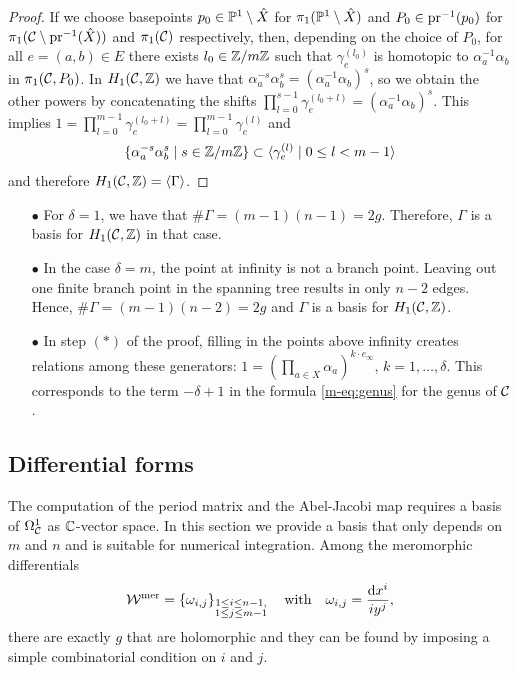 \documentclass[main.tex]{subfiles}
\begin{document}
\begin{proof}
  If we choose basepoints $p_0 \in \P^1 \setminus \hat{X}$ for $\pi_1(\P^1 \setminus \hat{X})$ and $P_0 \in \pr^{-1}(p_0)$ for $\pi_1(\cu \setminus \pr^{-1}(\hat{X}))$ and $\pi_1(\cu)$ respectively, then,
  depending on the choice of $P_0$, for all $e = (a,b) \in E$ there exists $l_0 \in \Z/m\Z$ such that $\gamma_e^{(l_0)}$ is homotopic to $\alpha_a^{-1} \alpha_b$ in $\pi_1(\cu,P_0)$.
   In $\homo$ we have that $\alpha_a^{-s}\alpha_b^{s} = ( \alpha_a^{-1}\alpha_b)^s$, so we obtain the other powers by concatenating
  the shifts $\prod_{l = 0}^{s-1} \gamma_e^{(l_0+l)} = (\alpha_a^{-1}\alpha_b)^s$.
  This implies $1 = \prod_{l = 0}^{m-1} \gamma_e^{(l_0+l)} = \prod_{l = 0}^{m-1} \gamma_e^{(l)}$ and
   $$\{  \alpha_a^{-s} \alpha_b^{s}  \mid  s \in \Z/m\Z  \} \subset  \langle  \gamma_e^{(l)} 
  \mid  0 \le l < m-1 \rangle$$ and therefore $\homo = \langle  \Gamma  \rangle$.
  \end{proof}

  \begin{rmk}
  \begin{itemize}
   \item[$\bullet$] For $\delta = 1$, we have that $\# \Gamma = (m-1)(n-1) = 2g$. Therefore, $\Gamma$ is a basis for $\homo$ in that case.
   \item[$\bullet$] In the case $\delta = m$, the point at infinity is not a branch point. Leaving out one finite branch point in the spanning tree results in only $n-2$ edges. Hence,
   $\# \Gamma = (m-1)(n-2) = 2g$ and $\Gamma$ is a basis for $\homo$.
   \item[$\bullet$] In step $(*)$ of the proof, filling in the points above infinity creates relations among
  these generators:
  $1 = (\prod_{a \in X} \alpha_a)^{k \cdot e_{\infty}}$, $k = 1,\dots,\delta$. This corresponds to the term $-\delta+1$ in the formula \eqref{m-eq:genus} for the genus of $\cu$. 
  \end{itemize}
  \end{rmk}



\subsection{Differential forms}\label{subsec:diff_forms}

    The computation of the period matrix and the Abel-Jacobi map requires a basis of $\hd$ as $\C$-vector space. In this section we provide a basis that only
   depends on $m$ and $n$ and is suitable for numerical integration. \abstand
    Among the meromorphic differentials
    \begin{align*}
 \WM = \left\{  \omega_{i,j}   \right\}_{\substack{1 \le i \le n-1, \\ 1 \le j \le m-1}} \quad \text{with} \quad \omega_{i,j} = \frac{ \dx^i}{i y^j},
  \end{align*}
  there are exactly $g$ that are holomorphic  and they can be found by imposing a simple combinatorial condition on $i$ and $j$.
\end{document}
